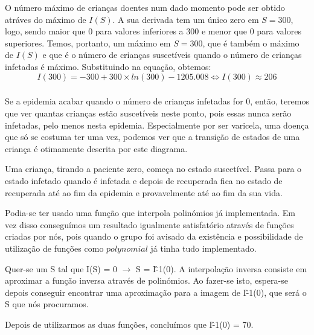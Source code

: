 \documentclass[portuguese, a4paper]{article}
\begin{document}
		O número máximo de crianças doentes num dado momento pode ser obtido
		atráves do máximo de $I(S)$. A sua derivada tem um único zero em $S = 300$,
		logo, sendo maior que 0 para valores inferiores a 300 e menor que 0 para valores superiores.
		Temos, portanto, um máximo em $S = 300$, que é também o máximo de $I(S)$ e que é
		o número de crianças suscetíveis quando o número de crianças infetadas é máximo.
		Substituindo na equação, obtemos:
		$$I(300) = -300 + 300 \times ln(300) - 1205.008 \Leftrightarrow I(300) \approx 206 $$

		\subsubsection{}
		\par
		Se a epidemia acabar quando o número de crianças infetadas for 0, então, teremos
		que ver quantas crianças estão suscetíveis neste ponto, pois essas nunca serão infetadas, pelo menos nesta
		epidemia. Especialmente por ser varicela, uma doença que só se costuma ter uma vez,
		podemos ver que a transição de estados de uma criança
		é otimamente descrita por este diagrama.

		Uma criança, tirando a paciente zero, começa no estado suscetível. Passa
		para o estado infetado quando é infetada e depois de recuperada fica no estado de recuperada até ao fim da
		epidemia e provavelmente até ao fim da sua vida.


		Podia-se ter usado uma função que interpola polinómios já implementada.
		Em vez disso conseguímos um resultado igualmente satisfatório através de funções criadas por nós, pois
		quando o grupo foi avisado da existência e possibilidade de utilização de funções como $polynomial$ %
		já tinha tudo implementado.

		Quer-se um S tal que I(S) = 0 $\rightarrow$ S = I\^-1(0).
		A interpolação inversa consiste em aproximar a função inversa através de polinómios.
		Ao fazer-se isto, espera-se depois conseguir encontrar uma aproximação
		para a imagem de I\^-1(0), 
		que será o S que nós procuramos.
		\par
		Depois de utilizarmos as duas funções, concluímos que I\^-1(0) = 70.
		
		\subsubsection{}
		\par
		
\end{document}
